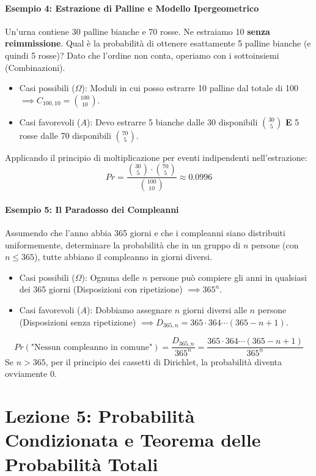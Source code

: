 \documentclass[12pt, a4paper]{article}
\begin{document}
\paragraph{Esempio 4: Estrazione di Palline e Modello Ipergeometrico}
Un'urna contiene 30 palline bianche e 70 rosse. Ne estraiamo 10 \textbf{senza reimmissione}. Qual è la probabilità di ottenere esattamente 5 palline bianche (e quindi 5 rosse)?
Dato che l'ordine non conta, operiamo con i sottoinsiemi (Combinazioni).
\begin{itemize}
    \item Casi possibili ($\Omega$): Moduli in cui posso estrarre 10 palline dal totale di 100 $\implies C_{100,10} = \binom{100}{10}$.
    \item Casi favorevoli ($A$): Devo estrarre 5 bianche dalle 30 disponibili $\binom{30}{5}$ \textbf{E} 5 rosse dalle 70 disponibili $\binom{70}{5}$.
\end{itemize}
Applicando il principio di moltiplicazione per eventi indipendenti nell'estrazione:
$$ Pr = \frac{\binom{30}{5} \cdot \binom{70}{5}}{\binom{100}{10}} \approx 0.0996 $$

\paragraph{Esempio 5: Il Paradosso dei Compleanni}
Assumendo che l'anno abbia 365 giorni e che i compleanni siano distribuiti uniformemente, determinare la probabilità che in un gruppo di $n$ persone (con $n \le 365$), tutte abbiano il compleanno in giorni diversi.
\begin{itemize}
    \item Casi possibili ($\Omega$): Ognuna delle $n$ persone può compiere gli anni in qualsiasi dei 365 giorni (Disposizioni con ripetizione) $\implies 365^n$.
    \item Casi favorevoli ($A$): Dobbiamo assegnare $n$ giorni diversi alle $n$ persone (Disposizioni senza ripetizione) $\implies D_{365,n} = 365 \cdot 364 \cdots (365 - n + 1)$.
\end{itemize}
$$ Pr(\text{"Nessun compleanno in comune"}) = \frac{D_{365,n}}{365^n} = \frac{365 \cdot 364 \cdots (365 - n + 1)}{365^n} $$
Se $n > 365$, per il principio dei cassetti di Dirichlet, la probabilità diventa ovviamente 0.

\section{Lezione 5: Probabilità Condizionata e Teorema delle Probabilità Totali}
\end{document}
